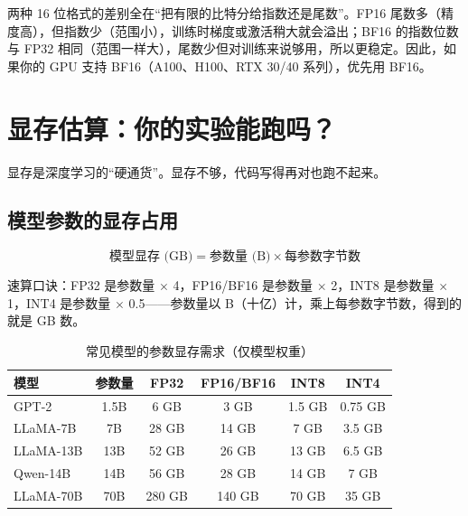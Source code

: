 \begin{keyidea}[BF16 vs FP16]
两种 16 位格式的差别全在“把有限的比特分给指数还是尾数”。FP16 尾数多（精度高），但指数少（范围小），训练时梯度或激活稍大就会溢出；BF16 的指数位数与 FP32 相同（范围一样大），尾数少但对训练来说够用，所以更稳定。因此，如果你的 GPU 支持 BF16（A100、H100、RTX 30/40 系列），优先用 BF16。
\end{keyidea}

\section*{显存估算：你的实验能跑吗？}

显存是深度学习的“硬通货”。显存不够，代码写得再对也跑不起来。

\subsection*{模型参数的显存占用}

\begin{keyformula}[title=模型显存速算]
\begin{equation}
    \text{模型显存 (GB)} = \text{参数量 (B)} \times \text{每参数字节数}
\end{equation}

速算口诀：FP32 是参数量 $\times$ 4，FP16/BF16 是参数量 $\times$ 2，INT8 是参数量 $\times$ 1，INT4 是参数量 $\times$ 0.5——参数量以 B（十亿）计，乘上每参数字节数，得到的就是 GB 数。
\end{keyformula}

\begin{table}[htbp]
\centering
\renewcommand{\arraystretch}{1.3}
\begin{tabular}{l|c|c|c|c|c}
\toprule
\textbf{模型} & \textbf{参数量} & \textbf{FP32} & \textbf{FP16/BF16} & \textbf{INT8} & \textbf{INT4} \\
\midrule
GPT-2 & 1.5B & 6 GB & 3 GB & 1.5 GB & 0.75 GB \\
LLaMA-7B & 7B & 28 GB & 14 GB & 7 GB & 3.5 GB \\
LLaMA-13B & 13B & 52 GB & 26 GB & 13 GB & 6.5 GB \\
Qwen-14B & 14B & 56 GB & 28 GB & 14 GB & 7 GB \\
LLaMA-70B & 70B & 280 GB & 140 GB & 70 GB & 35 GB \\
\bottomrule
\end{tabular}
\caption{常见模型的参数显存需求（仅模型权重）}
\end{table}

